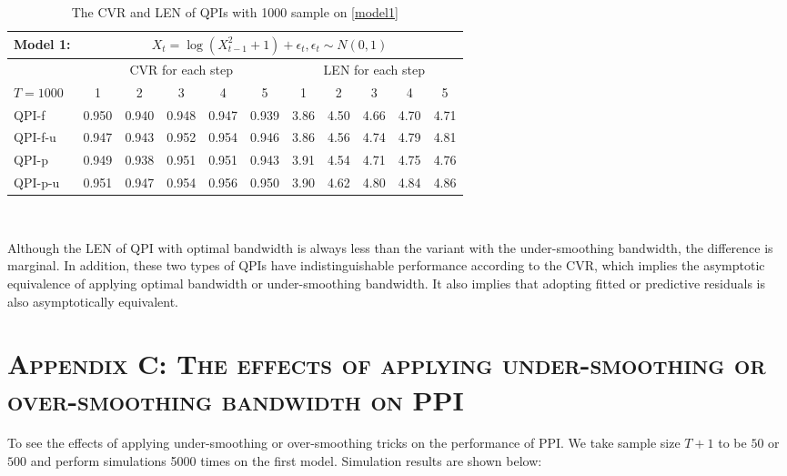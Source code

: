 \documentclass[a4paper]{article}
\begin{document}
\begin{table}[htbp]
\centering
  \caption{The CVR and LEN of QPIs with 1000 sample on \cref{model1}}
  \vspace{2pt}
  \label{Tab:model1T1000}
\begin{tabular}{lcccccccccc}
  \toprule 
 Model 1: & \multicolumn{10}{c}{$X_t = \log(X_{t-1}^2 + 1) + \epsilon_t, \epsilon_t\sim N(0,1)$} \\
 \midrule
  & \multicolumn{5}{c}{CVR for each step} & \multicolumn{5}{c}{LEN for each step}\\
    $T = 1000$  & 1     & 2     & 3     & 4     & 5 & 1 & 2 & 3 & 4 & 5  \\[3pt]
QPI-f & 0.950 & 0.940 & 0.948 & 0.947 & 0.939 &3.86 & 4.50 & 4.66 & 4.70 & 4.71 \\QPI-f-u & 0.947 & 0.943 & 0.952 & 0.954 & 0.946& 3.86 & 4.56 & 4.74 & 4.79 & 4.81 \\ 
QPI-p & 0.949 & 0.938 & 0.951 & 0.951 & 0.943& 3.91 & 4.54 & 4.71 & 4.75 & 4.76 \\
QPI-p-u & 0.951 & 0.947 & 0.954 & 0.956 & 0.950 & 3.90 & 4.62 & 4.80 & 4.84 & 4.86 \\  
       \bottomrule
    \end{tabular}\\
\end{table}
Although the LEN of QPI with optimal bandwidth is always less than the variant with the under-smoothing bandwidth, the difference is marginal. In addition, these two types of QPIs have indistinguishable performance according to the CVR, which implies the asymptotic equivalence of applying optimal bandwidth or under-smoothing bandwidth. It also implies that adopting fitted or predictive residuals is also asymptotically equivalent.  
\clearpage

\section*{\textsc{Appendix C: The effects of applying under-smoothing or over-smoothing bandwidth on PPI}}\label{Appendix:diffoverunderband}

To see the effects of applying under-smoothing or over-smoothing tricks on the performance of PPI. We take sample size $T+1$ to be $50$ or $500$ and perform simulations 5000 times on the first model. Simulation results are shown below:
\end{document}
